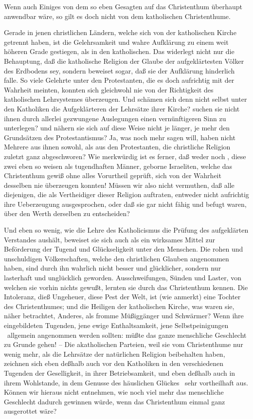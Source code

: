 Wenn auch Einiges von dem so eben Gesagten auf das Christenthum überhaupt anwendbar wäre, so gilt es doch nicht von dem katholischen Christenthume.
\begin{aufza}
\item Gerade in jenen christlichen Ländern, welche sich von der katholischen Kirche getrennt haben, ist die Gelehrsamkeit und wahre Aufklärung zu einem weit höheren Grade gestiegen, als in den katholischen. Das widerlegt nicht nur die Behauptung, daß die katholische Religion der Glaube der aufgeklärtesten Völker des Erdbodens sey, sondern beweiset sogar, daß sie der Aufklärung hinderlich falle. So viele Gelehrte unter den Protestanten, die es doch aufrichtig mit der Wahrheit meinten, konnten sich gleichwohl nie von der Richtigkeit des katholischen Lehrsystemes überzeugen. Und schämen sich denn nicht selbst unter den Katholiken die Aufgeklärteren der Lehrsätze ihrer Kirche? suchen sie nicht ihnen durch allerlei gezwungene Auslegungen einen vernünftigeren Sinn zu unterlegen? und nähern sie sich auf diese Weise nicht je länger, je mehr den Grundsätzen des Protestantismus? Ja, was noch mehr sagen will, haben nicht Mehrere aus ihnen sowohl, als aus den Protestanten, die christliche Religion zuletzt ganz abgeschworen? Wie merkwürdig ist es ferner, daß weder  noch , diese zwei eben so weisen als tugendhaften Männer, geborne Israeliten, welche das Christenthum gewiß ohne alles Vorurtheil geprüft, sich von der Wahrheit desselben nie überzeugen konnten! Müssen wir also nicht vermuthen, daß alle diejenigen, die als Vertheidiger dieser Religion auftraten, entweder nicht aufrichtig ihre Ueberzeugung ausgesprochen, oder daß sie gar nicht fähig und befugt waren, über den Werth derselben zu entscheiden?
\item Und eben so wenig, wie die Lehre des Katholicismus die Prüfung des aufgeklärten Verstandes aushält, beweiset sie sich auch als ein wirksames Mittel zur Beförderung der Tugend und Glückseligkeit unter den Menschen. Die rohen und unschuldigen Völkerschaften, welche den christlichen Glauben angenommen haben, sind durch ihn wahrlich nicht besser und glücklicher, sondern nur lasterhaft und unglücklich geworden. Ausschweifungen, Sünden und Laster, von welchen sie vorhin nichts gewußt, lernten sie durch das Christenthum kennen. Die Intoleranz, dieß Ungeheuer, diese Pest der Welt, ist (wie  anmerkt) eine Tochter des Christenthumes; und die Heiligen der katholischen Kirche, was waren sie, näher betrachtet, Anderes, als fromme Müßiggänger und Schwärmer? Wenn ihre eingebildeten Tugenden, jene ewige Enthaltsamkeit, jene Selbstpeinigungen \usw\ allgemein angenommen werden sollten: müßte das ganze menschliche Geschlecht zu Grunde gehen! -- Die akatholischen Parteien, weil sie vom Christenthume nur wenig mehr, als die Lehrsätze der natürlichen Religion beibehalten haben, zeichnen sich eben deßhalb auch vor den Katholiken in den verschiedenen Tugenden der Geselligkeit, in ihrer Betriebsamkeit, und eben deßhalb auch in ihrem Wohlstande, in dem Genusse des häuslichen Glückes \usw\ sehr vortheilhaft aus. Können wir hieraus nicht entnehmen, wie noch viel mehr das menschliche Geschlecht dadurch gewinnen würde, wenn das Christenthum einmal ganz ausgerottet wäre?

\end{aufza}
